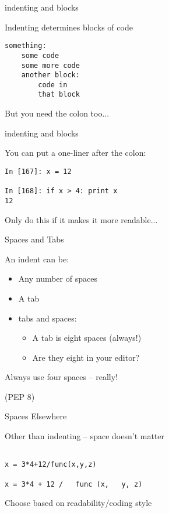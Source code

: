 \documentclass{beamer}
\begin{document}
\begin{frame}[fragile]{indenting and blocks}

{\Large  Indenting determines blocks of code }

\vfill
\begin{verbatim}
something:
    some code
    some more code
    another block:
        code in 
        that block
\end{verbatim}

\vfill
{\Large But you need the colon too...}

\end{frame}

\begin{frame}[fragile]{indenting and blocks}

{\Large  You can put a one-liner after the colon:}

\vfill
\begin{verbatim}
In [167]: x = 12

In [168]: if x > 4: print x
12
\end{verbatim}

\vfill
{\Large Only do this if it makes it more readable...}

\end{frame}


\begin{frame}[fragile]{Spaces and Tabs}

{\Large  An indent can be:}
\begin{itemize}
  \item Any number of spaces
  \item A tab
  \item tabs and spaces:
    \begin{itemize}
      \item A tab is eight spaces (always!)
      \item Are they eight in your editor?
    \end{itemize}
\end{itemize}

\vfill
{\LARGE Always use four spaces -- really!}

\vfill
(PEP 8)

\end{frame}


\begin{frame}[fragile]{Spaces Elsewhere}

{\Large  Other than indenting -- space doesn't matter}

\vfill
\begin{verbatim}

x = 3*4+12/func(x,y,z)

x = 3*4 + 12 /   func (x,   y, z) 

\end{verbatim}

\vfill
{\Large Choose based on readability/coding style}

\vfill
{}

\end{frame}
\end{document}

